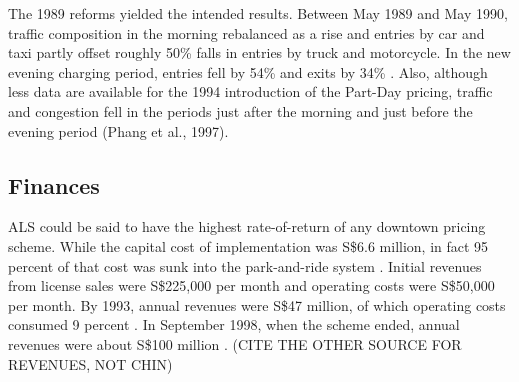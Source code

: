 The 1989 reforms yielded the intended results. Between May 1989 and May 1990, traffic composition in the morning rebalanced as a rise and entries by car and taxi partly offset roughly 50\% falls in entries by truck and motorcycle. In the new evening charging period, entries fell by 54\% and exits by 34\% \citep[p. 19]{Gomez-Ibanez1994}. Also, although less data are available for the 1994 introduction of the Part-Day pricing, traffic and congestion fell in the periods just after the morning and just before the evening period (Phang et al., 1997).

\subsection{Finances}

ALS could be said to have the highest rate-of-return of any downtown pricing scheme. While the capital cost of implementation was S\$6.6 million, in fact 95 percent of that cost was sunk into the park-and-ride system \citet[p. 38]{WatsonHolland1978}. Initial revenues from license sales were S\$225,000 per month and operating costs were S\$50,000 per month. By 1993, annual revenues were S\$47 million, of which operating costs consumed 9 percent \citep{PhangToh2004}. In September 1998, when the scheme ended, annual revenues were about S\$100 million \citep{Chin2010}. (CITE THE OTHER SOURCE FOR REVENUES, NOT CHIN)